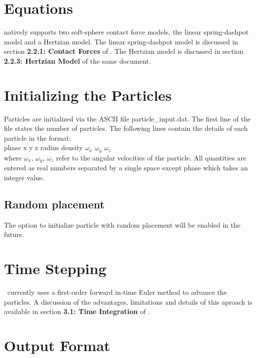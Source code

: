 \section{Equations}

\mfix natively supports two soft-sphere contact force models, the linear 
spring-dashpot model and a Hertzian model. The linear spring-dashpot
model is discussed in section {\bf 2.2.1: Contact Forces} of \demdoc. The 
Hertzian model is discussed in section {\bf 2.2.3: Hertzian Model} of the same
document. 


\section{Initializing the Particles}

Particles are initialized via the ASCII file {\sf particle\_input.dat}. The 
first line of the file states the number of particles. The following lines 
contain the details of each particle in the format: \\

{\sf phase x y z radius density $\omega_x$ $\omega_y$ $\omega_z$}  \\

\noindent
where $\omega_x$, $\omega_y$, $\omega_z$ refer to the angular velocities of the
particle. All quantities are entered as real numbers separated by a single space
except phase which takes an integer value.   


\subsection{Random placement}

The option to initialize particle with random placement will be enabled in 
the future. 


	
\section{Time Stepping}

\mfix\ currently uses a first-order forward in-time Euler method to advance 
the particles. A discussion of the advantages, limitations and details of this 
aproach is available in section {\bf 3.1: Time Integration} of \demdoc. 

\section{Output Format}

